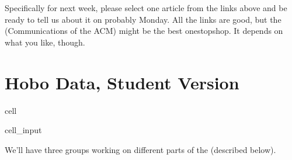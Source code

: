 \documentclass[letterpaper,10pt,english]{jupyterBook}
\begin{document}
\sphinxAtStartPar
Specifically for next week, please select one article from the links above and be ready to tell us about it on probably Monday. All the links are good, but the  (Communications of the ACM) might be the best one\sphinxhyphen{}stop\sphinxhyphen{}shop. It depends on what you like, though.

\sphinxstepscope


\chapter{Hobo Data, Student Version}
\label{\detokenize{lessons/Hobo_Student:hobo-data-student-version}}\label{\detokenize{lessons/Hobo_Student::doc}}
\begin{sphinxuseclass}{cell}\begin{sphinxVerbatimInput}

\begin{sphinxuseclass}{cell_input}
\begin{sphinxVerbatim}[commandchars=\\\{\}]
   
   
 
   
 
   
\end{sphinxVerbatim}

\end{sphinxuseclass}\end{sphinxVerbatimInput}

\end{sphinxuseclass}
\sphinxAtStartPar
We’ll have three groups working on different parts of the  (described below).
\end{document}
